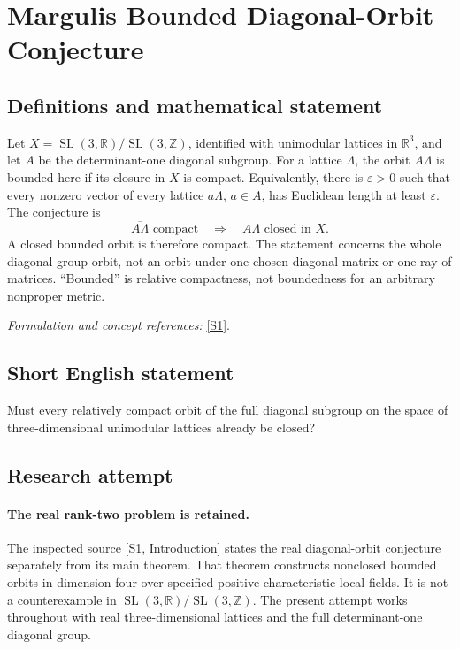 \documentclass[11pt]{article}
\begin{document}
\section*{\texorpdfstring{Margulis Bounded Diagonal-Orbit Conjecture}{Margulis Bounded Diagonal-Orbit Conjecture}}\label{393}
\subsection{Definitions and mathematical statement}
Let $X=\operatorname{SL}(3,{\mathbb{R}})/\operatorname{SL}(3,{\mathbb{Z}})$, identified with unimodular lattices in ${\mathbb{R}}^3$, and let $A$ be the determinant-one diagonal subgroup. For a lattice $\Lambda$, the orbit $A\Lambda$ is bounded here if its closure in $X$ is compact. Equivalently, there is ${\varepsilon}>0$ such that every nonzero vector of every lattice $a\Lambda$, $a\in A$, has Euclidean length at least ${\varepsilon}$. The conjecture is
\[
 \overline{A\Lambda}\text{ compact}\quad\Longrightarrow\quad
 A\Lambda\text{ closed in }X.
\]
A closed bounded orbit is therefore compact. The statement concerns the whole diagonal-group orbit, not an orbit under one chosen diagonal matrix or one ray of matrices. ``Bounded'' is relative compactness, not boundedness for an arbitrary nonproper metric.
\par\smallskip\textit{Formulation and concept references:} \href{https://arxiv.org/html/2504.17644v3}{[S1]}.

\subsection{Short English statement}
Must every relatively compact orbit of the full diagonal subgroup on the space of three-dimensional unimodular lattices already be closed?
\subsection{Research attempt}
\paragraph{The real rank-two problem is retained.}
The inspected source [S1, Introduction] states the real diagonal-orbit
conjecture separately from its main theorem. That theorem constructs
nonclosed bounded orbits in dimension four over specified positive
characteristic local fields. It is not a counterexample in
$\operatorname{SL}(3,\mathbb R)/\operatorname{SL}(3,\mathbb Z)$.
The present attempt works throughout with real three-dimensional
lattices and the full determinant-one diagonal group.
\end{document}
